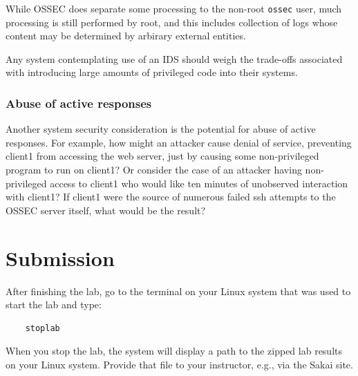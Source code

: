 While OSSEC does separate some processing to the non-root {\tt ossec} user, much processing is still performed by root,
and this includes collection of logs whose content may be determined by arbirary external entities.

Any system contemplating use of an IDS should weigh the trade-offs associated with introducing large amounts of
privileged code into their systems.   

\subsubsection{Abuse of active responses}
Another system security consideration is the potential for abuse of active responses.  For example, how might an attacker
cause denial of service, preventing client1 from accessing the web server, just by causing some non-privileged program to
run on client1?  Or consider the case of an attacker having non-privileged access to client1 who would like ten minutes
of unobserved interaction with client1?  If client1 were the source of numerous failed ssh attempts to the OSSEC server itself,
what would be the result?

\section{Submission}
After finishing the lab, go to the terminal on your Linux system that was used to start the lab and type:
\begin{verbatim}
    stoplab 
\end{verbatim}
When you stop the lab, the system will display a path to the zipped lab results on your Linux system.  Provide that file to 
your instructor, e.g., via the Sakai site.

\copyrightnotice


